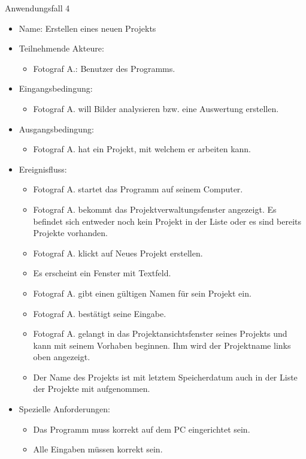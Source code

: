 	\begin{description}
		\item[Anwendungsfall 4]
	\end{description}
	
		\begin{itemize}
			\item Name: Erstellen eines neuen Projekts
			\item Teilnehmende Akteure:
			\begin{itemize}
				\item	Fotograf A.: Benutzer des Programms.
			\end{itemize}
			\item Eingangsbedingung:
			\begin{itemize}
				\item Fotograf A. will Bilder analysieren bzw. eine Auswertung erstellen.						
			\end{itemize}
			\item Ausgangsbedingung:
			\begin{itemize}
				\item	Fotograf A. hat ein Projekt, mit welchem er arbeiten kann.		
			\end{itemize}
			\item Ereignisfluss:
			\begin{itemize}
				\item Fotograf A. startet das Programm auf seinem Computer.
				\item Fotograf A. bekommt das Projektverwaltungsfenster angezeigt. Es befindet sich entweder noch kein Projekt in der Liste oder es sind bereits Projekte vorhanden.
				\item Fotograf A. klickt auf Neues Projekt erstellen.
				\item Es erscheint ein Fenster mit Textfeld.
				\item Fotograf A. gibt einen gültigen Namen für sein Projekt ein.
				\item Fotograf A. bestätigt seine Eingabe.
				\item Fotograf A. gelangt in das Projektansichtsfenster seines Projekts und kann mit seinem Vorhaben beginnen. Ihm wird der Projektname links oben angezeigt.
				\item Der Name des Projekts ist mit letztem Speicherdatum auch in der Liste der Projekte mit aufgenommen.
			\end{itemize}
			\item Spezielle Anforderungen:
			\begin{itemize}
				\item	Das Programm muss korrekt auf dem PC eingerichtet sein.
				\item Alle Eingaben müssen korrekt sein.
			\end{itemize}			
		\end{itemize}
		
